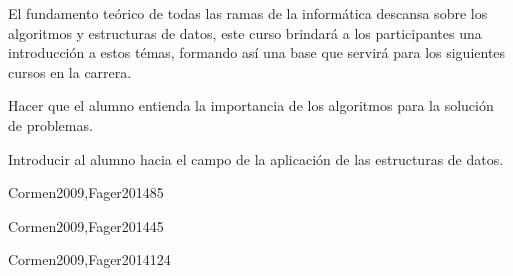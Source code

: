 \begin{syllabus}


\begin{justification}
El fundamento teórico de todas las ramas de la informática descansa sobre los algoritmos y estructuras de datos, este curso brindará a los participantes una introducción a estos témas, formando así una base que servirá para los siguientes cursos en la carrera.
\end{justification}

\begin{goals}
\item Hacer que el alumno entienda la importancia de los algoritmos para la solución de problemas.
\item Introducir al alumno hacia el campo de la aplicación de las estructuras de datos.
\end{goals}

\begin{outcomes}
\end{outcomes}

\begin{unit}{\PFFundamentalDataStructuresDef}{Cormen2009,Fager2014}{8}{5}
   \PFFundamentalDataStructuresAllTopics
   \PFFundamentalDataStructuresAllObjectives
\end{unit}

\begin{unit}{\PFRecursionDef}{Cormen2009,Fager2014}{4}{5}
    \PFRecursionAllTopics
    \PFRecursionAllObjectives
\end{unit}

\begin{unit}{\ALFundamentalAlgorithmsDef}{Cormen2009,Fager2014}{12}{4}
    \ALFundamentalAlgorithmsAllTopics
    \ALFundamentalAlgorithmsAllObjectives
\end{unit}


\end{syllabus}
